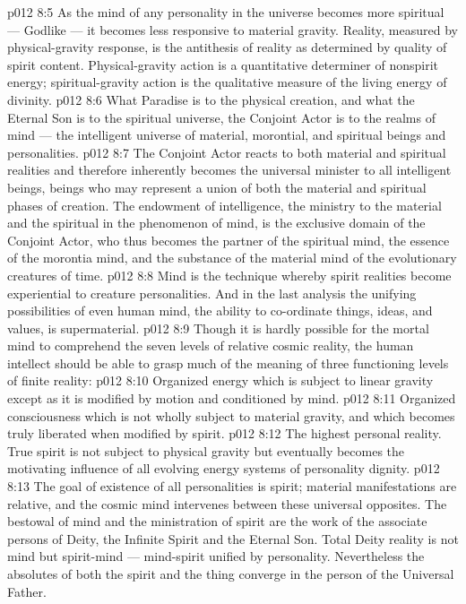 \vs p012 8:5 As the mind of any personality in the universe becomes more spiritual --- Godlike --- it becomes less responsive to material gravity. Reality, measured by physical\hyp{}gravity response, is the antithesis of reality as determined by quality of spirit content. Physical\hyp{}gravity action is a quantitative determiner of nonspirit energy; spiritual\hyp{}gravity action is the qualitative measure of the living energy of divinity.
\vs p012 8:6 \pc What Paradise is to the physical creation, and what the Eternal Son is to the spiritual universe, the Conjoint Actor is to the realms of mind --- the intelligent universe of material, morontial, and spiritual beings and personalities.
\vs p012 8:7 The Conjoint Actor reacts to both material and spiritual realities and therefore inherently becomes the universal minister to all intelligent beings, beings who may represent a union of both the material and spiritual phases of creation. The endowment of intelligence, the ministry to the material and the spiritual in the phenomenon of mind, is the exclusive domain of the Conjoint Actor, who thus becomes the partner of the spiritual mind, the essence of the morontia mind, and the substance of the material mind of the evolutionary creatures of time.
\vs p012 8:8 Mind is the technique whereby spirit realities become experiential to creature personalities. And in the last analysis the unifying possibilities of even human mind, the ability to co\hyp{}ordinate things, ideas, and values, is supermaterial.
\vs p012 8:9 \pc Though it is hardly possible for the mortal mind to comprehend the seven levels of relative cosmic reality, the human intellect should be able to grasp much of the meaning of three functioning levels of finite reality:
\vs p012 8:10 \bibnobreakspace {} Organized energy which is subject to linear gravity except as it is modified by motion and conditioned by mind.
\vs p012 8:11 \bibnobreakspace {} Organized consciousness which is not wholly subject to material gravity, and which becomes truly liberated when modified by spirit.
\vs p012 8:12 \bibnobreakspace {} The highest personal reality. True spirit is not subject to physical gravity but eventually becomes the motivating influence of all evolving energy systems of personality dignity.
\vs p012 8:13 \pc The goal of existence of all personalities is spirit; material manifestations are relative, and the cosmic mind intervenes between these universal opposites. The bestowal of mind and the ministration of spirit are the work of the associate persons of Deity, the Infinite Spirit and the Eternal Son. Total Deity reality is not mind but spirit\hyp{}mind --- mind\hyp{}spirit unified by personality. Nevertheless the absolutes of both the spirit and the thing converge in the person of the Universal Father.
